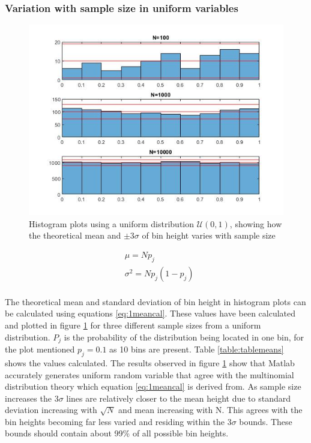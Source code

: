 \documentclass[twoside,twocolumn]{article}
\begin{document}
\subsubsection{Variation with sample size in uniform variables}
\begin{figure}[h]
  \centering
    \includegraphics[width=\linewidth]{1means}
  \caption{Histogram plots using a uniform distribution $\mathcal{U}(0,1)$, showing how the theoretical mean and $\pm3\sigma$ of bin height varies with sample size}
  \label{fig:1means}
\end{figure}

\begin{equation}
\label{eq:1meancal}
\begin{split}
&\mu = Np_{j}\\
&\sigma^2=Np_j(1-p_j)\\
\end{split}
\end{equation} 

The theoretical mean and standard deviation of bin height in histogram plots can be calculated using equations \ref{eq:1meancal}. These values have been calculated and plotted in figure \ref{fig:1means} for three different sample sizes from a uniform distribution. $P_j$ is the probability of the distribution being located in one bin, for the plot mentioned $p_j = 0.1$ as 10 bins are present. Table \ref{table:tablemeans} shows the values calculated.
The results observed in figure \ref{fig:1means} show that Matlab accurately generates uniform random variable that agree with the multinomial distribution theory which equation \ref{eq:1meancal} is derived from. As sample size increases the $3\sigma$ lines are relatively closer to the mean height due to standard deviation increasing with $\sqrt{N}$ and mean increasing with N. This agrees with the bin heights becoming far less varied and residing within the $3\sigma$ bounds. These bounds should contain about 99\% of all possible bin heights. 
\end{document}
